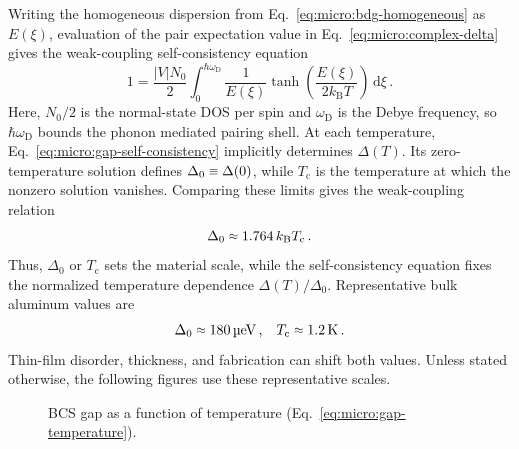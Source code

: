             Writing the homogeneous dispersion from Eq.~\eqref{eq:micro:bdg-homogeneous} as $E(\xi)$, evaluation of the pair expectation value in Eq.~\eqref{eq:micro:complex-delta} gives the weak-coupling self-consistency equation
            \begin{equation}
                1
                =\frac{|V|N_0}{2}
                \int_0^{\hbar\omega_\mathrm{D}}
                \frac{1}{E(\xi)}
                \tanh\!\left(\frac{E(\xi)}{2k_\mathrm{B}T}\right)
                \,\mathrm d\xi\,.
                \label{eq:micro:gap-self-consistency}
            \end{equation}
            Here, $N_0/2$ is the normal-state DOS per spin and $\omega_\mathrm{D}$ is the Debye frequency, so $\hbar\omega_\mathrm{D}$ bounds the phonon mediated pairing shell. At each temperature, Eq.~\eqref{eq:micro:gap-self-consistency} implicitly determines $\Delta(T)$. Its zero-temperature solution defines $\Delta_0\sequiv\Delta(0)$, while $T_\mathrm{c}$ is the temperature at which the nonzero solution vanishes. Comparing these limits gives the weak-coupling relation
            \begin{equation}
                \Delta_0
                \sapprox 1.764\, k_\mathrm{B} T_\mathrm{c}\,.
                \label{eq:micro:gap-zero-temperature}
            \end{equation}
            Thus, $\Delta_0$ or $T_\mathrm{c}$ sets the material scale, while the self-consistency equation fixes the normalized temperature dependence $\Delta(T)/\Delta_0$. \cite{bardeen_theory_1957,tinkham_introduction_2004}
            Representative bulk aluminum values are
            \begin{align}
                \Delta_0 \sapprox \qty{180}{\micro\electronvolt}\,, &&
                T_\mathrm{c} \sapprox \qty{1.2}{\kelvin}\,.
                \label{eq:micro:aluminum-scales}
            \end{align}
            Thin-film disorder, thickness, and fabrication can shift both values. Unless stated otherwise, the following figures use these representative scales. \cite{giaever_study_1961,tinkham_introduction_2004}

            \begin{figure}
                \captionsetup{format=plain}%
                \centering
                \caption{BCS gap as a function of temperature (Eq.~\ref{eq:micro:gap-temperature}).}
                \label{fig:micro:gap}
            \end{figure}

